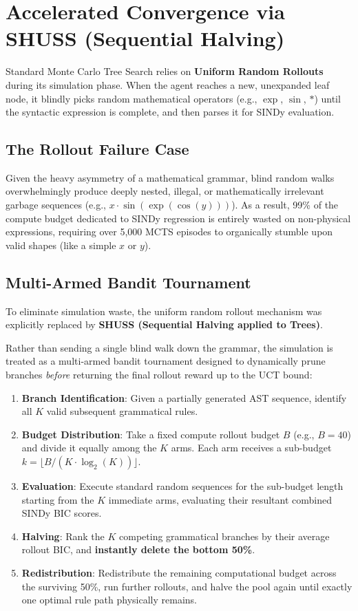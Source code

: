 \documentclass[11pt, a4paper]{article}
\begin{document}
\section{Accelerated Convergence via SHUSS (Sequential Halving)}

Standard Monte Carlo Tree Search relies on \textbf{Uniform Random Rollouts} during its simulation phase. When the agent reaches a new, unexpanded leaf node, it blindly picks random mathematical operators (e.g., $\exp$, $\sin$, $*$) until the syntactic expression is complete, and then parses it for SINDy evaluation.

\subsection{The Rollout Failure Case}
Given the heavy asymmetry of a mathematical grammar, blind random walks overwhelmingly produce deeply nested, illegal, or mathematically irrelevant garbage sequences (e.g., $x \cdot \sin(\exp(\cos(y)))$). As a result, 99\% of the compute budget dedicated to SINDy regression is entirely wasted on non-physical expressions, requiring over 5,000 MCTS episodes to organically stumble upon valid shapes (like a simple $x$ or $y$).

\subsection{Multi-Armed Bandit Tournament}
To eliminate simulation waste, the uniform random rollout mechanism was explicitly replaced by \textbf{SHUSS (Sequential Halving applied to Trees)}. 

Rather than sending a single blind walk down the grammar, the simulation is treated as a multi-armed bandit tournament designed to dynamically prune branches \textit{before} returning the final rollout reward up to the UCT bound:

\begin{enumerate}
    \item \textbf{Branch Identification}: Given a partially generated AST sequence, identify all $K$ valid subsequent grammatical rules.
    \item \textbf{Budget Distribution}: Take a fixed compute rollout budget $B$ (e.g., $B=40$) and divide it equally among the $K$ arms. Each arm receives a sub-budget $k = \lfloor B / (K \cdot \log_2(K)) \rfloor$.
    \item \textbf{Evaluation}: Execute standard random sequences for the sub-budget length starting from the $K$ immediate arms, evaluating their resultant combined SINDy BIC scores.
    \item \textbf{Halving}: Rank the $K$ competing grammatical branches by their average rollout BIC, and \textbf{instantly delete the bottom 50\%}.
    \item \textbf{Redistribution}: Redistribute the remaining computational budget across the surviving 50\%, run further rollouts, and halve the pool again until exactly one optimal rule path physically remains. 
\end{enumerate}
\end{document}
